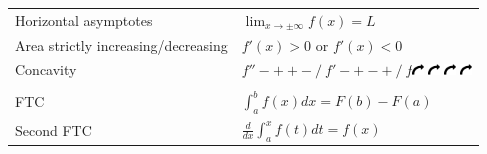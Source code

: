 \begin{landscape}
\begin{multicols*}{2}
\begin{tabularx}{\columnwidth}{@{}lX@{}}
            Horizontal asymptotes               & $\lim_{x\to\pm\infty}f(x)=L$                                                                                                                                                                                                                                                                                           \\
            Area strictly increasing/decreasing & $f'(x)>0$ or $f'(x)<0$                                                                                                                                                                                                                                                                                                 \\
            Concavity                           & $f''-++-\ /\ f'-+-+\ /\ f$\includegraphics[width=0.3cm,origin=c, angle=270]{./img/arrow.png}  \includegraphics[width=0.3cm,origin=c, angle=180]{./img/arrow.png}  \includegraphics[width=0.3cm,origin=c, angle=90]{./img/arrow.png}  \includegraphics[width=0.3cm,origin=c, angle=0]{./img/arrow.png}                  \\
                                                &                                                                                                                                                                                                                                                                                                                        \\
            FTC                                 & $\int_{a}^{b}f(x)dx=F(b)-F(a)$                                                                                                                                                                                                                                                                                         \\
            Second FTC                          & $\frac{d}{dx}\int_{a}^{x}f(t)dt=f(x)$                                                                                                                                                                                                                                                                                  \\

\end{tabularx}
\end{multicols*}
\end{landscape}
